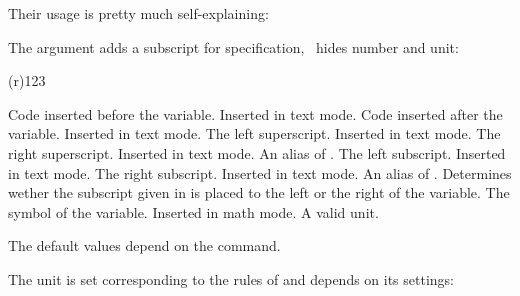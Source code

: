 \documentclass{chemmacros-manual}
\begin{document}
Their usage is pretty much self-explaining:
\begin{example}
   \par
   \par
\end{example}
The argument  adds a subscript for specification, \sarg\ hides
number and unit:
\begin{example}
    \enthalpy(r){123} \par
     \par
\end{example}

\begin{options}
    Code inserted before the variable.  Inserted in text mode.
  \Default
    Code inserted after the variable.  Inserted in text mode.
  \Default
    The left superscript.  Inserted in text mode.
    The right superscript. Inserted in text mode.
    An alias of .
  \Default
    The left subscript.  Inserted in text mode.
  \Default
    The right subscript.  Inserted in text mode.
    An alias of .
    Determines wether the subscript given in  is placed to the
    left or the right of the variable.
  \Default
    The symbol of the variable.  Inserted in math mode.
  \Default
    A valid  unit.
\end{options}

The default values depend on the command.
\begin{example}
   \par
   \par
\end{example}
The unit is set corresponding to the rules of  and depends on
its settings:
\begin{example}
   \par
\end{example}
\end{document}
